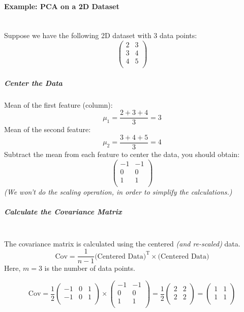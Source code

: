 \documentclass[]{article}
\begin{document}
	\paragraph{Example: PCA on a 2D Dataset}
	\noindent\\
	Suppose we have the following 2D dataset with 3 data points:
	$$
	\begin{pmatrix}
		2 & 3 \\
		3 & 4 \\
		4 & 5 \\
	\end{pmatrix}
	$$
	
	\subparagraph{Center the Data}
	Mean of the first feature (column):
	$$
	\mu_1 = \frac{2 + 3 + 4}{3} = 3
	$$
	Mean of the second feature:
	$$
	\mu_2 = \frac{3 + 4 + 5}{3} = 4
	$$
	Subtract the mean from each feature to center the data, you should obtain:
	$$
	\begin{pmatrix}
		-1 & -1 \\
		0 & 0 \\
		1 & 1 \\
	\end{pmatrix}
	$$
	\textit{(We won't do the scaling operation, in order to simplify the calculations.)}
	
	\subparagraph{Calculate the Covariance Matrix}
	\noindent\\
	The covariance matrix is calculated using the centered \textit{(and re-scaled)} data.
	$$
	\text{Cov} = \frac{1}{n-1} \text{(Centered Data)}^\text{T} \times \text{(Centered Data)}
	$$
	Here, $m=3$ is the number of data points.
	
	$$
	\text{Cov} = \frac{1}{2} 
	\begin{pmatrix}
		-1 & 0 & 1 \\
		-1 & 0 & 1 \\
	\end{pmatrix}
	\times
	\begin{pmatrix}
		-1 & -1 \\
		0 & 0 \\
		1 & 1 \\
	\end{pmatrix}
	=
	\frac{1}{2}
	\begin{pmatrix}
		2 & 2 \\
		2 & 2 \\
	\end{pmatrix}
	=
	\begin{pmatrix}
		1 & 1 \\
		1 & 1 \\
	\end{pmatrix}
	$$
	
\end{document}
